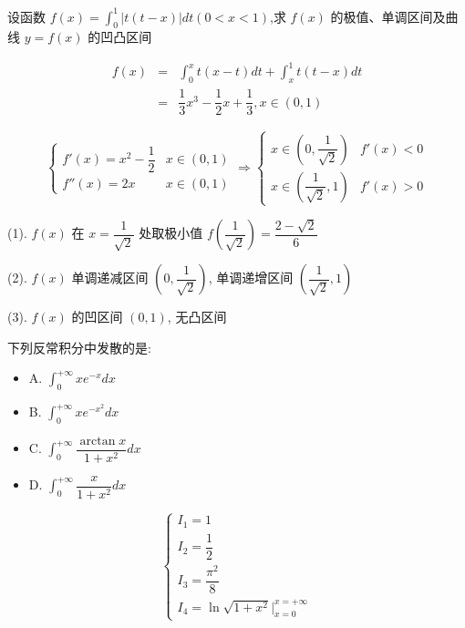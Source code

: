 \begin{example}[][Exam: 28.3.12]
	设函数 $f(x)=\int_{0}^{1}|t(t-x)|dt(0<x<1)$,求 $f(x)$ 的极值、单调区间及曲线 $y=f(x)$ 的凹凸区间
\end{example}
\begin{solution}
	\begin{eqnarray*}
		f(x) & = & \int_{0}^{x}t(x-t)dt + \int_{x}^{1}t(t-x)dt\\
			 & = & \dfrac{1}{3}x^{3} - \dfrac{1}{2}x + \dfrac{1}{3}, x\in (0,1)
	\end{eqnarray*}

	$$\begin{cases}
	  f'(x) = x^{2} - \dfrac{1}{2} & x\in(0,1)\\
	  f''(x) = 2x & x\in(0,1)
	\end{cases}\Rightarrow 
	\begin{cases}
		x\in (0,\dfrac{1}{\sqrt{2}}) & f'(x) < 0\\
		x\in (\dfrac{1}{\sqrt{2}},1) & f'(x) > 0
	\end{cases}$$

(1). $f(x)$ 在 $x = \dfrac{1}{\sqrt{2}}$ 处取极小值 $f(\dfrac{1}{\sqrt{2}}) = \dfrac{2-\sqrt{2}}{6}$

(2). $f(x)$ 单调递减区间 $(0,\dfrac{1}{\sqrt{2}})$, 单调递增区间 $(\dfrac{1}{\sqrt{2}},1)$

(3). $f(x)$ 的凹区间 $(0,1)$, 无凸区间

\end{solution}
\begin{example}[][Exam: 28.3.13]
	下列反常积分中发散的是:
\begin{itemize}
	\item A. $\int_{0}^{+\infty}xe^{-x}dx$
	\item B. $\int_{0}^{+\infty}xe^{-x^{2}}dx$
	\item C. $\int_{0}^{+\infty}\dfrac{\arctan x}{1+x^{2}}dx$
	\item D. $\int_{0}^{+\infty}\dfrac{x}{1+x^{2}}dx$
\end{itemize}
\end{example}
\begin{solution}
	$$\begin{cases}
	  I_{1} = 1 \\
	  I_{2} = \dfrac{1}{2} \\
	  I_{3} = \dfrac{\pi^{2}}{8} \\
	  I_{4} = \ln \sqrt{1+x^{2}}\big|_{x=0}^{x=+\infty}
	\end{cases}$$
\end{solution}

